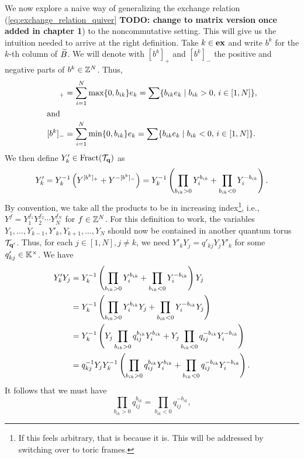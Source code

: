 We now explore a naive way of generalizing the exchange relation
(\cref{eq:exchange_relation_quiver} \textbf{TODO: change to matrix version once added
	in chapter 1}) to the noncommutative setting. This will give us the intuition needed to
arrive at the right definition. Take $k \in \mathbf{ex}$ and write $b^k$ for the $k$-th column
of $\widetilde{B}$. We will denote with $[b^k]_{+}$ and $[b^k]_{-}$ the positive and negative
parts of $b^k \in \mathbb{Z}^N$. Thus,
\begin{align*}
	[b^k]_{+} & = \sum_{i=1}^N \max\{0, b_{ik}\}e_k = \sum \{b_{ik}e_k \mid b_{ik} > 0, \, i \in [1, N]\}, \\
	\shortintertext{and}
	[b^k]_{-} & = \sum_{i=1}^N \min\{0, b_{ik}\}e_k = \sum \{b_{ik}e_k \mid b_{ik} < 0,\, i \in [1, N]\}.
\end{align*}
We then define $Y'_k \in \operatorname{Fract}(\mathcal{T}_{\mathbf{q}})$ as
\begin{equation}\label{eq:quantum_exchange_naive}
	Y_k' = Y_k^{-1} \left(Y^{[b^k]_{+}} + Y^{-[b^k]_{-}}\right) = Y_k^{-1} \left(\prod_{b_{ik} > 0}Y_i^{b_{ik}} + \prod_{b_{ik} < 0} Y_i^{-b_{ik}}\right).
\end{equation}
%
By convention, we take all the products to be in increasing index\footnote{If this
	feels arbitrary, that is because it is. This will be addressed by switching over to
	toric frames.}, i.e., $Y^f = Y_1^{f_1}Y_2^{f_2} \cdots Y_N^{f_N}$ for $f \in \mathbb{Z}^N$.
For this definition to work, the variables $Y_1, \dots, Y_{k-1}, Y'_k, Y_{k+1}, \dots,
	Y_N$ should now be contained in another quantum torus $\mathcal{T}_{\mathbf{q}'}$. Thus, for each $j
	\in [1, N], j \neq k$, we need $Y'_k Y_j = q'_{kj} Y_j Y'_k$ for some $q'_{kj} \in
	\mathbb{K}^\times$. We have
\begin{align*}
	Y'_k Y_j
	 & = Y_k^{-1} \left(\prod_{b_{ik} > 0} Y_i^{b_{ik}} + \prod_{b_{ik} < 0}Y_i^{-b_{ik}}\right) Y_j                                             \\
	 & = Y_k^{-1} \left(\prod_{b_{ik} > 0} Y_i^{b_{ik}}Y_j + \prod_{b_{ik} < 0}Y_i^{-b_{ik}}Y_j\right)                                           \\
	 & = Y_k^{-1} \left(Y_j \prod_{b_{ik} > 0} q_{ij}^{b_{ik}} Y_i^{b_{ik}} + Y_j \prod_{b_{ik} < 0}q_{ij}^{-b_{ik}}Y_i^{-b_{ik}}\right)         \\
	 & = q_{kj}^{-1} Y_j Y_k^{-1} \left(\prod_{b_{ik} > 0} q_{ij}^{b_{ik}} Y_i^{b_{ik}} + \prod_{b_{ik} < 0}q_{ij}^{-b_{ik}}Y_i^{-b_{ik}}\right).
\end{align*}
%
It follows that we must have
\begin{equation}\label{eq:b_plus_is_b_minus}
	\prod_{b_{ik} > 0}q_{ij}^{b_{ik}} = \prod_{b_{ik} < 0}q_{ij}^{ - b_{ik}},
\end{equation}
